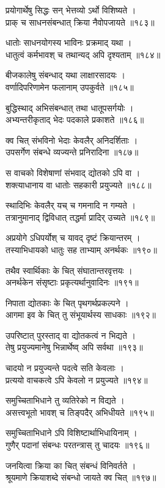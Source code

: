 प्रयोगार्थेषु सिद्धः सन् भेत्तव्यो ऽर्थो विशिष्यते ।\\प्राक् च साधनसंबन्धात् क्रिया नैवोपजायते ॥१८३॥

धातोः साधनयोगस्य भाविनः प्रक्रमाद् यथा ।\\धातुत्वं कर्मभावश् च तथान्यद् अपि दृश्यताम् ॥१८४॥

बीजकालेषु संबन्धाद् यथा लाक्षारसादयः ।\\वर्णादिपरिणामेन फलानाम् उपकुर्वते ॥१८५॥

बुद्धिस्थाद् अभिसंबन्धात् तथा धातूपसर्गयोः ।\\अभ्यन्तरीकृताद् भेदः पदकाले प्रकाशते ॥१८६॥

क्व चित् संभविनो भेदाः केवलैर् अनिदर्शिताः ।\\उपसर्गेण संबन्धे व्यज्यन्ते प्रनिरादिना ॥१८७॥

स वाचको विशेषाणां संभवाद् द्योतको ऽपि वा ।\\शक्त्याधानाय वा धातोः सहकारी प्रयुज्यते ॥१८८॥

स्थादिभिः केवलैर् यच् च गमनादि न गम्यते ।\\तत्रानुमानाद् द्विविधात् तद्धर्मा प्रादिर् उच्यते ॥१८९॥

अप्रयोगे ऽधिपर्योश् च यावद् दृष्टं क्रियान्तरम् ।\\तस्याभिधायको धातुः सह ताभ्याम् अनर्थकः ॥१९०॥

तथैव स्वार्थिकाः के चित् संघातान्तरवृत्तयः ।\\अनर्थकेन संसृष्टाः प्रकृत्यर्थानुवादिनः ॥१९१॥

निपाता द्योतकाः के चित् पृथगर्थप्रकल्पने ।\\आगमा इव के चित् तु संभूयार्थस्य साधकाः ॥१९२॥

उपरिष्टात् पुरस्ताद् वा द्योतकत्वं न भिद्यते ।\\तेषु प्रयुज्यमानेषु भिन्नार्थेष्व् अपि सर्वथा ॥१९३॥

चादयो न प्रयुज्यन्ते पदत्वे सति केवलाः ।\\प्रत्ययो वाचकत्वे ऽपि केवलो न प्रयुज्यते ॥१९४॥

समुच्चिताभिधाने तु व्यतिरेको न विद्यते ।\\असत्त्वभूतो भावश् च तिङ्पदैर् अभिधीयते ॥१९५॥

समुच्चिताभिधाने ऽपि विशिष्टार्थाभिधायिनाम् ।\\गुणैर् पदानां संबन्धः परतन्त्रास् तु चादयः ॥१९६॥

जनयित्वा क्रिया का चित् संबन्धं विनिवर्तते ।\\श्रूयमाणे क्रियाशब्दे संबन्धो जायते क्व चित् ॥१९७॥


